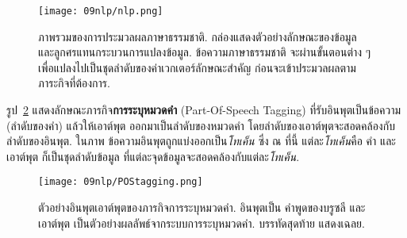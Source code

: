 %
\begin{figure}
	\begin{center}
		\texttt{[image: 09nlp/nlp.png]}	
		\caption[ภาพรวมของการประมวลผลภาษาธรรมชาติ]{ภาพรวมของการประมวลผลภาษาธรรมชาติ.
		กล่องแสดงตัวอย่างลักษณะของข้อมูล และลูกศรแทนกระบวนการแปลงข้อมูล.
		ข้อความภาษาธรรมชาติ จะผ่านขั้นตอนต่าง ๆ เพื่อแปลงไปเป็นชุดลำดับของค่าเวกเตอร์ลักษณะสำคัญ ก่อนจะเข้าประมวลผลตามภาระกิจที่ต้องการ.
		}
		\label{fig: nlp process overview}
	\end{center}
\end{figure}
%

รูป~\ref{fig: nlp POS tagging}
แสดงลักษณะภารกิจ\textbf{การระบุหมวดคำ} (Part-Of-Speech Tagging)
ที่รับอินพุตเป็นข้อความ (ลำดับของคำ)
แล้วให้เอาต์พุต ออกมาเป็นลำดับของหมวดคำ โดยลำดับของเอาต์พุตจะสอดคล้องกับลำดับของอินพุต.
ในภาพ ข้อความอินพุตถูกแบ่งออกเป็น\textit{โทเค็น} ซึ่ง ณ ที่นี้ แต่ละ\textit{โทเค็น}คือ คำ
และเอาต์พุต ก็เป็นชุดลำดับข้อมูล ที่แต่ละจุดข้อมูลจะสอดคล้องกับแต่ละ\textit{โทเค็น}.

%
\begin{figure}
	\begin{center}
		\texttt{[image: 09nlp/POStagging.png]}	
		\caption[ตัวอย่างอินพุตเอาต์พุตของภารกิจการระบุหมวดคำ]{ตัวอย่างอินพุตเอาต์พุตของภารกิจการระบุหมวดคำ.
		อินพุตเป็น คำพูดของบรูซลี และเอาต์พุต เป็นตัวอย่างผลลัพธ์จากระบบการระบุหมวดคำ.
		บรรทัดสุดท้าย แสดงเฉลย.
		}
		\label{fig: nlp POS tagging}
	\end{center}
\end{figure}
%

%



